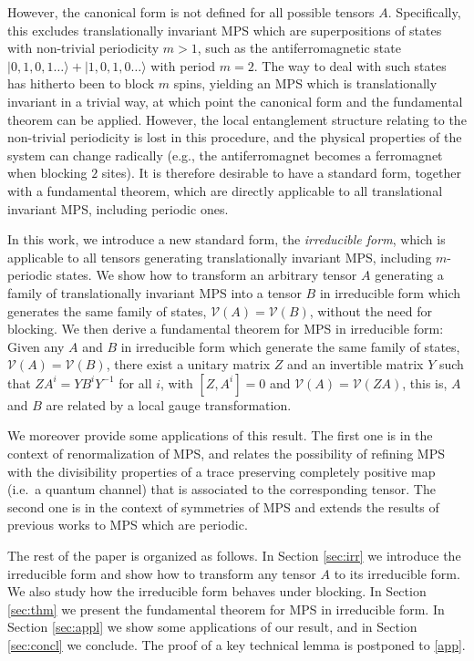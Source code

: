 \documentclass[pra,a4paper,notitlepage,nofootinbib,superscriptaddress]{revtex4-1}
\theoremstyle{plain}
\newcommand{\1}{{\openone}}
\newcommand{\ra}{\rangle}
\newcommand{\mc}{\mathcal}
\begin{document}
However, the canonical form is not defined for all possible tensors $A$.
Specifically, this excludes translationally invariant MPS which are
superpositions of states with non-trivial periodicity $m>1$, such as the
antiferromagnetic state $|0,1,0,1\ldots \ra + |1,0,1,0\ldots \ra$ with
period $m=2$. The way to deal with such states has hitherto been to block $m$
spins, yielding an MPS which is translationally invariant in a trivial
way, at which point the canonical form and the fundamental theorem can be
applied.  However, the local entanglement structure relating to the
non-trivial periodicity is lost in this procedure, and the physical
properties of the system can change radically (e.g., the antiferromagnet
becomes a ferromagnet when blocking $2$ sites). It is therefore desirable
to have a standard form, together with a fundamental theorem, which are
directly applicable to all translational invariant MPS, including periodic
ones.



In this work, we introduce a new standard form, the \emph{irreducible
    form}, which is applicable to all tensors generating translationally
invariant MPS, including $m$-periodic states. We show how to transform an
arbitrary tensor $A$ generating a family of translationally invariant MPS into
a tensor $B$ in irreducible form which generates the same family of states,
$\mc{V}(A)=\mc{V}(B)$, without the need for blocking.  We then derive a fundamental theorem for MPS in
irreducible form: Given any $A$ and $B$ in irreducible form which generate
the same family of states, $\mc{V}(A)=\mc{V}(B)$, there exist a unitary
matrix $Z$ and an invertible matrix $Y$ such that $ZA^i = YB^i Y^{-1}$ for
all $i$, with $[Z,A^i]=0$ and $\mc{V}(A)=\mc{V}(ZA)$, this is, $A$ and $B$
are related by a local gauge transformation.

We moreover provide some applications of this result. The first one is in the
context of renormalization of MPS, and relates the possibility of refining
MPS with the divisibility properties of a trace preserving completely
positive map (i.e.\ a quantum channel)  that is associated to the
corresponding tensor. The second one is in the context of symmetries of
MPS and extends the results of previous works to MPS which are periodic.



The rest of the paper is organized as follows.
In Section \ref{sec:irr} we introduce the irreducible form and show how to transform any tensor $A$ to its irreducible form. We also study how the irreducible form behaves under blocking.
In Section \ref{sec:thm} we present the fundamental theorem for MPS in irreducible form.
In Section \ref{sec:appl} we show some applications of our result, and
in Section \ref{sec:concl} we conclude. The proof of a key technical lemma is postponed to \cref{app}.
\end{document}
